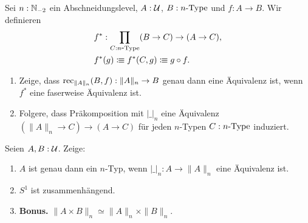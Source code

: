 \documentclass{uebung}
\begin{document}
\begin{exercise}
  Sei $n:\mathbb{N}_{-2}$ ein Abschneidungslevel, $A:\mathcal{U}$, $B:n\mbox{-}\mathrm{Type}$ und $f:A\to B$.
  Wir definieren
  \begin{align*}
    &f^*:\prod_{C:n\mbox{-}\mathrm{Type}}(B \to C) \to (A \to C),\\
    &f^*(g)\vcentcolon\mspace{-1.2mu}\equiv f^*(C,g)\vcentcolon\mspace{-1.2mu}\equiv g\circ f.
  \end{align*}
  \begin{enumerate}
    \item Zeige, dass $\mathrm{rec}_{\|A\|_n}(B,f):\|A\|_n\to B$ genau dann eine Äquivalenz ist, wenn $f^*$ eine faserweise Äquivalenz ist.
    \item Folgere, dass Präkomposition mit $|\_|_n$ eine Äquivalenz $(\|A\|_n \to C) \to (A \to C)$ für jeden $n$-Typen $C:n\mbox{-}\mathrm{Type}$ induziert.
  \end{enumerate}
\end{exercise}

\newpage
\begin{exercise}
  Seien $A,B:\mathcal{U}$.
  Zeige:
  \begin{enumerate}
    \item $A$ ist genau dann ein $n$-Typ, wenn $|\_|_n:A\to \|A\|_n$ eine Äquivalenz ist.
    \item $S^1$ ist zusammenhängend.
    \item \textbf{Bonus.} $\|A\times B\|_n \simeq \|A\|_n\times \|B\|_n$.
  \end{enumerate}
\end{exercise}
\end{document}
